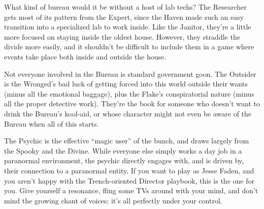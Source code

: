 \documentclass[12pt,oneside,landscape]{memoir}
\begin{document}
\begin{multicols}{3}
{What kind of bureau would it be without a host of lab techs?  The Researcher gets most of its pattern from the Expert, since the Haven made such an easy transition into a specialized lab to work inside.  Like the Janitor, they’re a little more focused on staying inside the oldest house.  However, they straddle the divide more easily, and it shouldn’t be difficult to include them in a game where events take place both inside and outside the house.}

{Not everyone involved in the Bureau is standard government goon.  The Outsider is the Wronged’s bad luck of getting forced into this world outside their wants (minus all the emotional baggage), plus the Flake’s conspiratorial nature (minus all the proper detective work).  They’re the book for someone who doesn’t want to drink the Bureau’s kool-aid, or whose character might not even be aware of the Bureau when all of this starts.}

{The Psychic is the effective “magic user” of the bunch, and draws largely from the Spooky and the Divine.  While everyone else simply works a day job in a paranormal environment, the psychic directly engages with, and is driven by, their connection to a paranormal entity.  If you want to play as Jesse Faden, and you aren’t happy with the Trench-oriented Director playbook, this is the one for you.  Give yourself a resonance, fling some TVs around with your mind, and don’t mind the growing chant of voices; it’s all perfectly under your control.}

\end{multicols}
\pagebreak

\fontsize{10}{12}\selectfont


\pagebreak


\pagebreak


\pagebreak


\pagebreak


\pagebreak


\pagebreak
\end{document}
